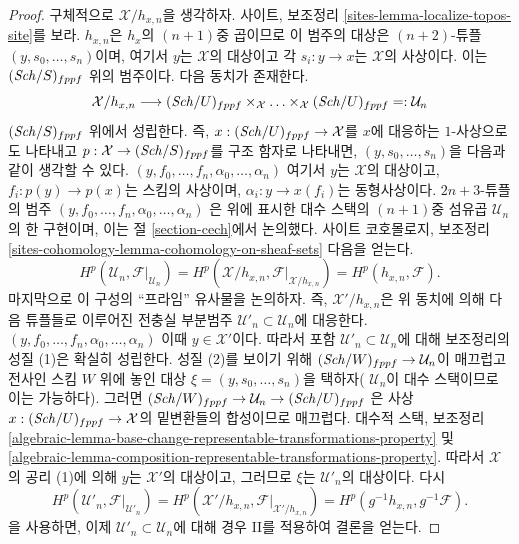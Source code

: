 \begin{proof}
\medskip\noindent
구체적으로 $\mathcal{X}/h_{x, n}$을 생각하자. 사이트, 보조정리
\ref{sites-lemma-localize-topos-site}를 보라.
$h_{x, n}$은 $h_x$의 $(n + 1)$중 곱이므로 이 범주의 대상은
$(n + 2)$-튜플
$(y, s_0, \ldots, s_n)$이며, 여기서 $y$는 $\mathcal{X}$의 대상이고 각
$s_i : y \to x$는 $\mathcal{X}$의 사상이다.
이는 $(\mathit{Sch}/S)_{fppf}$ 위의 범주이다. 다음 동치가 존재한다.
$$
\mathcal{X}/h_{x, n}
\longrightarrow
(\mathit{Sch}/U)_{fppf} \times_\mathcal{X} \ldots \times_\mathcal{X} (\mathit{Sch}/U)_{fppf}
=: \mathcal{U}_n
$$
$(\mathit{Sch}/S)_{fppf}$ 위에서 성립한다. 즉, $x : (\mathit{Sch}/U)_{fppf} \to \mathcal{X}$를
$x$에 대응하는 $1$-사상으로도 나타내고
$p : \mathcal{X} \to (\mathit{Sch}/S)_{fppf}$를 구조 함자로 나타내면,
$(y, s_0, \ldots, s_n)$을 다음과 같이 생각할 수 있다.
$(y, f_0, \ldots, f_n, \alpha_0, \ldots, \alpha_n)$
여기서 $y$는 $\mathcal{X}$의 대상이고, $f_i : p(y) \to p(x)$는
스킴의 사상이며, $\alpha_i : y \to x(f_i)$는 동형사상이다.
$2n+3$-튜플의 범주
$(y, f_0, \ldots, f_n, \alpha_0, \ldots, \alpha_n)$
은 위에 표시한 대수 스택의 $(n + 1)$중 섬유곱 $\mathcal{U}_n$의
한 구현이며, 이는 절 \ref{section-cech}에서 논의했다.
사이트 코호몰로지, 보조정리
\ref{sites-cohomology-lemma-cohomology-on-sheaf-sets}
다음을 얻는다.
$$
H^p(\mathcal{U}_n, \mathcal{F}|_{\mathcal{U}_n}) =
H^p(\mathcal{X}/h_{x, n}, \mathcal{F}|_{\mathcal{X}/h_{x, n}}) =
H^p(h_{x, n}, \mathcal{F}).
$$
마지막으로 이 구성의 ``프라임'' 유사물을 논의하자. 즉,
$\mathcal{X}'/h_{x, n}$은 위 동치에 의해 다음 튜플들로 이루어진
전충실 부분범주 $\mathcal{U}'_n \subset \mathcal{U}_n$에 대응한다.
$(y, f_0, \ldots, f_n, \alpha_0, \ldots, \alpha_n)$
이때 $y \in \mathcal{X}'$이다. 따라서 포함 $\mathcal{U}'_n \subset \mathcal{U}_n$에
대해 보조정리의 성질 (1)은 확실히 성립한다.
성질 (2)를 보이기 위해 $(\mathit{Sch}/W)_{fppf} \to \mathcal{U}_n$이
매끄럽고 전사인 스킴 $W$ 위에 놓인 대상
$\xi = (y, s_0, \ldots, s_n)$을 택하자( $\mathcal{U}_n$이 대수 스택이므로
이는 가능하다). 그러면
$(\mathit{Sch}/W)_{fppf} \to \mathcal{U}_n \to (\mathit{Sch}/U)_{fppf}$
은 사상 $x : (\mathit{Sch}/U)_{fppf} \to \mathcal{X}$의 밑변환들의 합성이므로
매끄럽다. 대수적 스택, 보조정리
\ref{algebraic-lemma-base-change-representable-transformations-property} 및
\ref{algebraic-lemma-composition-representable-transformations-property}.
따라서 $\mathcal{X}$의 공리 (1)에 의해 $y$는 $\mathcal{X}'$의 대상이고,
그러므로 $\xi$는 $\mathcal{U}'_n$의 대상이다.
다시
$$
H^p(\mathcal{U}'_n, \mathcal{F}|_{\mathcal{U}'_n}) =
H^p(\mathcal{X}'/h_{x, n}, \mathcal{F}|_{\mathcal{X}'/h_{x, n}}) =
H^p(g^{-1}h_{x, n}, g^{-1}\mathcal{F}).
$$
을 사용하면, 이제 $\mathcal{U}'_n \subset \mathcal{U}_n$에 대해 경우 II를
적용하여 결론을 얻는다.
\end{proof}









